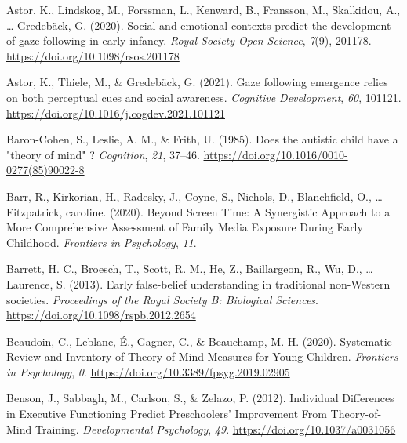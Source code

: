 \documentclass[
  man,floatsintext]{apa6}
\newlength{\cslhangindent}
\newlength{\cslentryspacingunit} %
\newenvironment{CSLReferences}[2] %
 {%
  \setlength{\parindent}{0pt}
  \ifodd #1
  \let\oldpar\par
  \def\par{\hangindent=\cslhangindent\oldpar}
  \fi
  \setlength{\parskip}{#2\cslentryspacingunit}
 }%
 {}
\begin{document}
\hypertarget{refs}{}
\begin{CSLReferences}{1}{0}
\leavevmode{}%
Astor, K., Lindskog, M., Forssman, L., Kenward, B., Fransson, M., Skalkidou, A., \ldots{} Gredebäck, G. (2020). Social and emotional contexts predict the development of gaze following in early infancy. \emph{Royal Society Open Science}, \emph{7}(9), 201178. \url{https://doi.org/10.1098/rsos.201178}

\leavevmode{}%
Astor, K., Thiele, M., \& Gredebäck, G. (2021). Gaze following emergence relies on both perceptual cues and social awareness. \emph{Cognitive Development}, \emph{60}, 101121. \url{https://doi.org/10.1016/j.cogdev.2021.101121}

\leavevmode{}%
Baron-Cohen, S., Leslie, A. M., \& Frith, U. (1985). Does the autistic child have a "theory of mind" ? \emph{Cognition}, \emph{21}, 37--46. \url{https://doi.org/10.1016/0010-0277(85)90022-8}

\leavevmode{}%
Barr, R., Kirkorian, H., Radesky, J., Coyne, S., Nichols, D., Blanchfield, O., \ldots{} Fitzpatrick, caroline. (2020). Beyond {Screen Time}: {A Synergistic Approach} to a {More Comprehensive Assessment} of {Family Media Exposure During Early Childhood}. \emph{Frontiers in Psychology}, \emph{11}.

\leavevmode{}%
Barrett, H. C., Broesch, T., Scott, R. M., He, Z., Baillargeon, R., Wu, D., \ldots{} Laurence, S. (2013). Early false-belief understanding in traditional non-{Western} societies. \emph{Proceedings of the Royal Society B: Biological Sciences}. \url{https://doi.org/10.1098/rspb.2012.2654}

\leavevmode{}%
Beaudoin, C., Leblanc, É., Gagner, C., \& Beauchamp, M. H. (2020). Systematic {Review} and {Inventory} of {Theory} of {Mind Measures} for {Young Children}. \emph{Frontiers in Psychology}, \emph{0}. \url{https://doi.org/10.3389/fpsyg.2019.02905}

\leavevmode{}%
Benson, J., Sabbagh, M., Carlson, S., \& Zelazo, P. (2012). Individual {Differences} in {Executive Functioning Predict Preschoolers}' {Improvement From Theory-of-Mind Training}. \emph{Developmental Psychology}, \emph{49}. \url{https://doi.org/10.1037/a0031056}


\end{CSLReferences}
\end{document}
